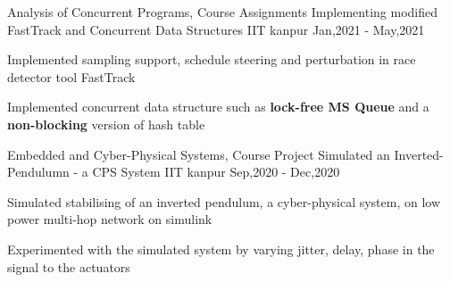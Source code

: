 
\begin{cventries}


\begin{comment}
   \cventry
  {Computer Networks, Course Assignments}
  {Implementation of Automatic Repeat Request(ARQ) Protocols}
  {IIT kanpur}
  {Jan,2020 - May,2021}
  {
     \begin{cvitems}
      \item Implemented Stop and Wait ARQ protocol and  Go-Back-N ARQ protocol with proper acknowledgements.
      \item Written code for both sender and receiver in \textbf{python} to transfer message/files using socket programming.
     \end{cvitems}
  }
\end{comment}

   \cventry
  {Analysis of Concurrent Programs, Course Assignments}
  {Implementing modified FastTrack and Concurrent Data Structures}
  {IIT kanpur}
  {Jan,2021 - May,2021}
  {
     \begin{cvitems}
      \item Implemented sampling support, schedule steering and perturbation in race detector tool FastTrack
      \item Implemented concurrent data structure such as \textbf{lock-free MS Queue} and a \textbf{non-blocking} version of hash table
     \end{cvitems}
  }

   \cventry
  {Embedded and Cyber-Physical Systems, Course Project}
  {Simulated an Inverted-Pendulumn - a CPS System}
  {IIT kanpur}
  {Sep,2020 - Dec,2020}
  {
     \begin{cvitems}
      \item Simulated stabilising of an inverted pendulum, a cyber-physical system, on low power multi-hop network on simulink
      \item Experimented with the simulated system by varying jitter, delay, phase in the signal to the actuators
     \end{cvitems}
  }



\end{cventries}
